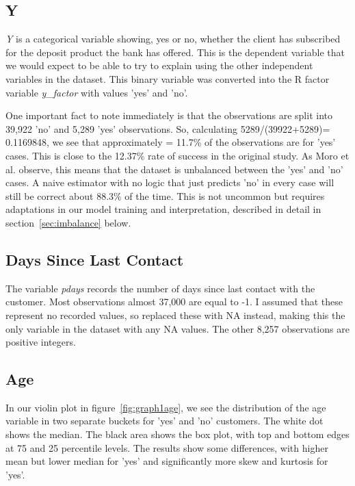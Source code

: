 \documentclass[9pt,technote]{IEEEtran}
\begin{document}
\subsection{Y} 

\textit{Y} is a categorical variable showing, yes or no, whether the client has subscribed for the deposit product the bank has offered.  This is the dependent variable that we would expect to be able to try to explain using the other independent variables in the dataset.  This binary variable was converted into the R factor variable \textit{y\_factor} with values 'yes' and 'no'.  

One important fact to note immediately is that the observations are split into 39,922 'no' and 5,289 'yes' observations.  So, calculating 5289/(39922+5289)=  0.1169848, we see that approximately = 11.7\% of the observations are for 'yes' cases.  This is close to the 12.37\% rate of success in the original study\cite{moro14}.  As Moro et al. observe, this means that the dataset is unbalanced between the 'yes' and 'no' cases.  A naive estimator with no logic that just predicts 'no' in every case will still be correct about 88.3\% of the time.   This is not uncommon but requires adaptations in our model training and interpretation, described in detail in section~\ref{sec:imbalance} below.  

\subsection{Days Since Last Contact}

The variable \textit{pdays} records the number of days since last contact with the customer.  Most observations almost 37,000 are equal to -1.  I assumed that these represent no recorded values, so replaced these with NA instead, making this the only variable in the dataset with any NA values.  The other 8,257 observations are positive integers.  

\subsection{Age}

In our violin plot in figure~\ref{fig:graph1age}, we see the distribution of the age variable in two separate buckets for 'yes' and 'no' customers.  The white dot shows the median.  The black area shows the box plot, with top and bottom edges at 75 and 25 percentile levels.  The results show some differences, with higher mean but lower median for 'yes' and significantly more skew and kurtosis for 'yes'.
\end{document}

